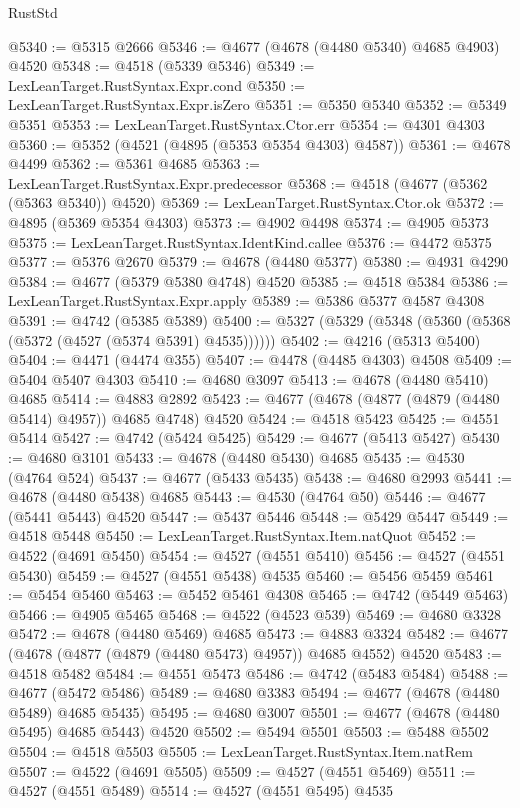 \begin{lexlean}{RustStd}
\begin{coremodule}
@5340 := @5315 @2666
@5346 := @4677 (@4678 (@4480 @5340) @4685 @4903) @4520
@5348 := @4518 (@5339 @5346)
@5349 := LexLeanTarget.RustSyntax.Expr.cond
@5350 := LexLeanTarget.RustSyntax.Expr.isZero
@5351 := @5350 @5340
@5352 := @5349 @5351
@5353 := LexLeanTarget.RustSyntax.Ctor.err
@5354 := @4301 @4303
@5360 := @5352 (@4521 (@4895 (@5353 @5354 @4303) @4587))
@5361 := @4678 @4499
@5362 := @5361 @4685
@5363 := LexLeanTarget.RustSyntax.Expr.predecessor
@5368 := @4518 (@4677 (@5362 (@5363 @5340)) @4520)
@5369 := LexLeanTarget.RustSyntax.Ctor.ok
@5372 := @4895 (@5369 @5354 @4303)
@5373 := @4902 @4498
@5374 := @4905 @5373
@5375 := LexLeanTarget.RustSyntax.IdentKind.callee
@5376 := @4472 @5375
@5377 := @5376 @2670
@5379 := @4678 (@4480 @5377)
@5380 := @4931 @4290
@5384 := @4677 (@5379 @5380 @4748) @4520
@5385 := @4518 @5384
@5386 := LexLeanTarget.RustSyntax.Expr.apply
@5389 := @5386 @5377 @4587 @4308
@5391 := @4742 (@5385 @5389)
@5400 := @5327 (@5329 (@5348 (@5360 (@5368 (@5372 (@4527 (@5374 @5391) @4535))))))
@5402 := @4216 (@5313 @5400)
@5404 := @4471 (@4474 @355)
@5407 := @4478 (@4485 @4303) @4508
@5409 := @5404 @5407 @4303
@5410 := @4680 @3097
@5413 := @4678 (@4480 @5410) @4685
@5414 := @4883 @2892
@5423 := @4677 (@4678 (@4877 (@4879 (@4480 @5414) @4957)) @4685 @4748) @4520
@5424 := @4518 @5423
@5425 := @4551 @5414
@5427 := @4742 (@5424 @5425)
@5429 := @4677 (@5413 @5427)
@5430 := @4680 @3101
@5433 := @4678 (@4480 @5430) @4685
@5435 := @4530 (@4764 @524)
@5437 := @4677 (@5433 @5435)
@5438 := @4680 @2993
@5441 := @4678 (@4480 @5438) @4685
@5443 := @4530 (@4764 @50)
@5446 := @4677 (@5441 @5443) @4520
@5447 := @5437 @5446
@5448 := @5429 @5447
@5449 := @4518 @5448
@5450 := LexLeanTarget.RustSyntax.Item.natQuot
@5452 := @4522 (@4691 @5450)
@5454 := @4527 (@4551 @5410)
@5456 := @4527 (@4551 @5430)
@5459 := @4527 (@4551 @5438) @4535
@5460 := @5456 @5459
@5461 := @5454 @5460
@5463 := @5452 @5461 @4308
@5465 := @4742 (@5449 @5463)
@5466 := @4905 @5465
@5468 := @4522 (@4523 @539)
@5469 := @4680 @3328
@5472 := @4678 (@4480 @5469) @4685
@5473 := @4883 @3324
@5482 := @4677 (@4678 (@4877 (@4879 (@4480 @5473) @4957)) @4685 @4552) @4520
@5483 := @4518 @5482
@5484 := @4551 @5473
@5486 := @4742 (@5483 @5484)
@5488 := @4677 (@5472 @5486)
@5489 := @4680 @3383
@5494 := @4677 (@4678 (@4480 @5489) @4685 @5435)
@5495 := @4680 @3007
@5501 := @4677 (@4678 (@4480 @5495) @4685 @5443) @4520
@5502 := @5494 @5501
@5503 := @5488 @5502
@5504 := @4518 @5503
@5505 := LexLeanTarget.RustSyntax.Item.natRem
@5507 := @4522 (@4691 @5505)
@5509 := @4527 (@4551 @5469)
@5511 := @4527 (@4551 @5489)
@5514 := @4527 (@4551 @5495) @4535

\end{coremodule}
\end{lexlean}
